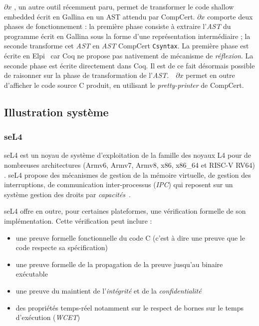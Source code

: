 $\partial x$ \cite{partialx, partialxrepo}, un autre outil récemment paru, permet de transformer le code shallow embedded écrit en Gallina en un AST attendu par CompCert. $\partial x$ comporte deux phases de fonctionnement : la première phase consiste à extraire l'\emph{AST} du programme écrit en Gallina sous la forme d'une représentation intermédiaire ; la seconde transforme cet \emph{AST} en \emph{AST} CompCert \texttt{Csyntax}. La première phase est écrite en Elpi~\cite{elpi} car Coq ne propose pas nativement de mécanisme de \emph{réflexion}. La seconde phase est écrite directement dans Coq. Il est de ce fait désormais possible de raisonner sur la phase de transformation de l'\emph{AST}.~~$\partial x$ permet en outre d'afficher le code source C produit, en utilisant le \emph{pretty-printer} de CompCert.

		\subsection{Illustration système}	

			\subsubsection{seL4}
	seL4 \cite{sel4website} est un noyau de système d'exploitation de la famille des noyaux L4 pour de nombreuses architectures (Armv6, Armv7, Armv8, x86, x86\_64 et RISC-V RV64) \cite{sel4hardware}. seL4 propose des mécanismes de gestion de la mémoire virtuelle, de gestion des interruptions, de communication inter-processus (\emph{IPC}) qui reposent sur un système gestion des droits par \emph{capacités}~\cite{capabilities}.

	seL4 offre en outre, pour certaines plateformes, une vérification formelle de son implémentation. Cette vérification peut inclure :
	\begin{itemize}
		\item{une preuve formelle fonctionnelle du code C (c'est à dire une preuve que le code respecte sa spécification) \cite{sel4}}
		\item{une preuve formelle de la propagation de la preuve jusqu'au binaire exécutable\cite{sel4binary}}
		\item{une preuve du maintient de l'\emph{intégrité} et de la \emph{confidentialité} \cite{sel4integrity}}
		\item{des propriétés temps-réel notamment sur le respect de bornes sur le temps d'exécution (\emph{WCET})\cite{sel4wcet}}
	\end{itemize}


